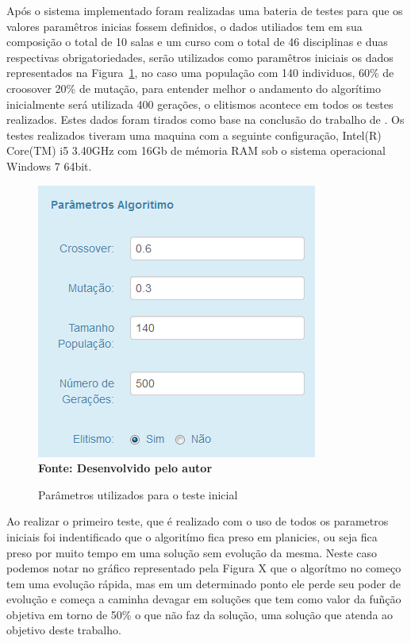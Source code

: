 \documentclass{abntpuc}
\begin{document}
%
%
%
%
%
%



\iniciocapitulo

Após o sistema implementado foram realizadas uma bateria de testes para que os valores paramêtros inicias fossem definidos, o dados utiliados tem  em sua composição o total de 10 salas e um curso com o total de 46 disciplinas e duas respectivas obrigatoriedades, serão utilizados como paramêtros iniciais os dados representados na Figura~\ref{fig:parametrosAg}, no caso uma população com 140 individuos, 60\% de croosover 20\% de mutação, para entender melhor o andamento do algorítimo inicialmente será utilizada 400 gerações, o elitismos acontece em todos os testes realizados. Estes dados foram tirados como base na conclusão do trabalho de \cite{deleonardo}. Os testes realizados tiveram uma maquina com a seguinte configuração, Intel(R) Core(TM) i5 3.40GHz com 16Gb de mémoria RAM sob o sistema operacional Windows 7 64bit.\par

\begin{figure}[!htb]
\caption[Parâmetros utilizados para o teste inicial]{Parâmetros utilizados para o teste inicial}
\label{fig:parametrosAg}
\centering
\includegraphics[scale=0.5]{imagens/parametrosDoAlgoritimo.png}
\\ \textbf{\footnotesize Fonte: Desenvolvido pelo autor}
\end{figure}

Ao realizar o primeiro teste, que é realizado com o uso de  todos os parametros iniciais foi indentificado que o algoritímo fica preso em planicies, ou seja fica preso por muito tempo em uma solução sem evolução da mesma. Neste caso podemos notar no gráfico representado pela Figura X que o algorítmo no começo tem uma evolução rápida, mas em um determinado ponto ele perde seu poder de evolução e começa a caminha devagar em soluções que tem como valor da fuñção objetiva em torno de 50\% o que não faz da solução, uma solução que atenda ao objetivo deste trabalho.
\end{document}
